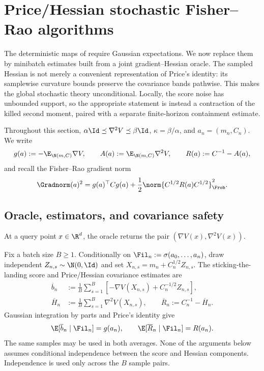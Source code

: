 \section{Price/Hessian stochastic Fisher--Rao algorithms}
\label{sec:stochastic}

The deterministic maps of  require Gaussian
expectations.  We now replace them by minibatch estimates built from a joint
gradient--Hessian oracle.  The sampled Hessian is not merely a convenient
representation of Price's identity: its samplewise curvature bounds preserve
the covariance bands pathwise.  This makes the global stochastic theory
unconditional.  Locally, the score noise has unbounded support, so the
appropriate statement is instead a contraction of the killed second moment,
paired with a separate finite-horizon containment estimate.

Throughout this section,
\(\alpha\Id\preceq\nabla^2V\preceq\beta\Id\),
\(\kappa=\beta/\alpha\), and \(a_n=(m_n,C_n)\).  We write
\[
  g(a):=-\E_{\N(m,C)}\nabla V,
  \qquad
  A(a):=\E_{\N(m,C)}\nabla^2V,
  \qquad
  R(a):=C^{-1}-A(a),
\]
and recall the Fisher--Rao gradient norm
\[
  \Gradnorm(a)^2
  =g(a)^\top Cg(a)
   +\frac12\norm{C^{1/2}R(a)C^{1/2}}_{\Frob}^2.
\]

\subsection{Oracle, estimators, and covariance safety}
\label{sec:stoch-oracle}

\begin{definition}
\label{def:stoch-oracle}
At a query point \(x\in\R^d\), the oracle returns the pair
\((\nabla V(x),\nabla^2V(x))\).
\end{definition}

Fix a batch size \(B\geq1\).  Conditionally on
\(\Fil_n:=\sigma(a_0,\ldots,a_n)\), draw independent
\(Z_{n,s}\sim\N(0,\Id)\) and set
\(X_{n,s}=m_n+C_n^{1/2}Z_{n,s}\).  The sticking-the-landing
score and Price/Hessian covariance estimates are
\begin{align}
  \overline b_n
  &:=\frac1B\sum_{s=1}^B
  \left[-\nabla V(X_{n,s})+C_n^{-1/2}Z_{n,s}\right],
  \label{eq:stoch-score}\\
  \overline H_n
  &:=\frac1B\sum_{s=1}^B\nabla^2V(X_{n,s}),
  \qquad
  \overline R_n:=C_n^{-1}-\overline H_n.
  \label{eq:stoch-hessian-estimator}
\end{align}
Gaussian integration by parts and Price's identity give
\begin{equation}
  \E[\overline b_n\mid\Fil_n]=g(a_n),
  \qquad
  \E[\overline R_n\mid\Fil_n]=R(a_n).
  \label{eq:stoch-unbiased}
\end{equation}
The same samples may be used in both averages.  None of the arguments below
assumes conditional independence between the score and Hessian components.
Independence is used only across the \(B\) sample pairs.

